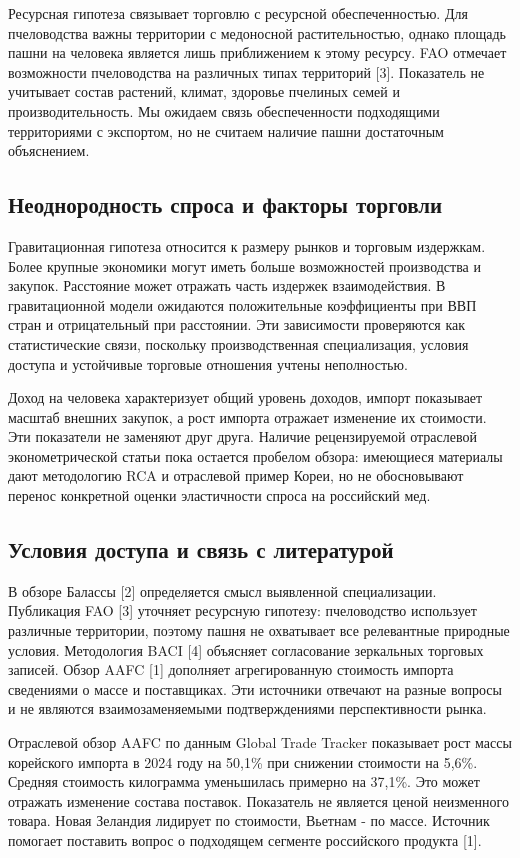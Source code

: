 \documentclass[12pt,a4paper]{article}
\begin{document}
Ресурсная гипотеза связывает торговлю с ресурсной обеспеченностью. Для пчеловодства важны территории с медоносной растительностью, однако площадь пашни на человека является лишь приближением к этому ресурсу. FAO отмечает возможности пчеловодства на различных типах территорий [3]. Показатель не учитывает состав растений, климат, здоровье пчелиных семей и производительность. Мы ожидаем связь обеспеченности подходящими территориями с экспортом, но не считаем наличие пашни достаточным объяснением.

\subsection{Неоднородность спроса и факторы торговли}
Гравитационная гипотеза относится к размеру рынков и торговым издержкам. Более крупные экономики могут иметь больше возможностей производства и закупок. Расстояние может отражать часть издержек взаимодействия. В гравитационной модели ожидаются положительные коэффициенты при ВВП стран и отрицательный при расстоянии. Эти зависимости проверяются как статистические связи, поскольку производственная специализация, условия доступа и устойчивые торговые отношения учтены неполностью.

Доход на человека характеризует общий уровень доходов, импорт показывает масштаб внешних закупок, а рост импорта отражает изменение их стоимости. Эти показатели не заменяют друг друга. Наличие рецензируемой отраслевой эконометрической статьи пока остается пробелом обзора: имеющиеся материалы дают методологию RCA и отраслевой пример Кореи, но не обосновывают перенос конкретной оценки эластичности спроса на российский мед.

\subsection{Условия доступа и связь с литературой}
В обзоре Балассы [2] определяется смысл выявленной специализации. Публикация FAO [3] уточняет ресурсную гипотезу: пчеловодство использует различные территории, поэтому пашня не охватывает все релевантные природные условия. Методология BACI [4] объясняет согласование зеркальных торговых записей. Обзор AAFC [1] дополняет агрегированную стоимость импорта сведениями о массе и поставщиках. Эти источники отвечают на разные вопросы и не являются взаимозаменяемыми подтверждениями перспективности рынка.

Отраслевой обзор AAFC по данным Global Trade Tracker показывает рост массы корейского импорта в 2024 году на 50,1\% при снижении стоимости на 5,6\%. Средняя стоимость килограмма уменьшилась примерно на 37,1\%. Это может отражать изменение состава поставок. Показатель не является ценой неизменного товара. Новая Зеландия лидирует по стоимости, Вьетнам - по массе. Источник помогает поставить вопрос о подходящем сегменте российского продукта [1].
\end{document}
